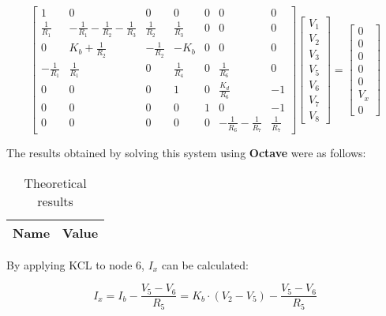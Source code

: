 \begin{equation}
  \begin{bmatrix}
    1 & 0 & 0 & 0 & 0 & 0 & 0 \\
    \frac{1}{R_1} & -\frac{1}{R_1}-\frac{1}{R_2}-\frac{1}{R_3} & \frac{1}{R_2} & \frac{1}{R_3} & 0 & 0 & 0 \\
    0 & K_b + \frac{1}{R_2} & -\frac{1}{R_2} & -K_b & 0 & 0 & 0 \\
    -\frac{1}{R_1} & \frac{1}{R_1} & 0 & \frac{1}{R_4} & 0 &\frac{1}{R_6} & 0 \\
    0 & 0 & 0 & 1 & 0 & \frac{K_d}{R_6} & -1 \\
    0 & 0 & 0 & 0 & 1 & 0 & -1 \\
    0 & 0 & 0 & 0 & 0 & -\frac{1}{R_6}-\frac{1}{R_7} & \frac{1}{R_7}
  \end{bmatrix}
  \begin{bmatrix}
    V_1 \\
    V_2 \\
    V_3 \\
    V_5 \\
    V_6 \\
    V_7 \\
    V_8
  \end{bmatrix}
  =
  \begin{bmatrix}
    0 \\
    0 \\
    0 \\
    0 \\
    0 \\
    V_x \\
    0
  \end{bmatrix}
\end{equation}

The results obtained by solving this system using \textbf{Octave} were as follows:

\begin{table}[H]
  \centering
  \begin{tabular}{|c|c|}
    \hline
        {\bf Name} & {\bf Value} \\
        \hline
        \hline
        
        \hline
  \end{tabular}
  \caption{Theoretical results}
\end{table}

By applying KCL to node 6, $I_x$ can be calculated:

\begin{equation}
  I_x = I_b - \frac{V_5-V_6}{R_5} = K_b \cdot (V_2-V_5) - \frac{V_5-V_6}{R_5} 
\end{equation}

